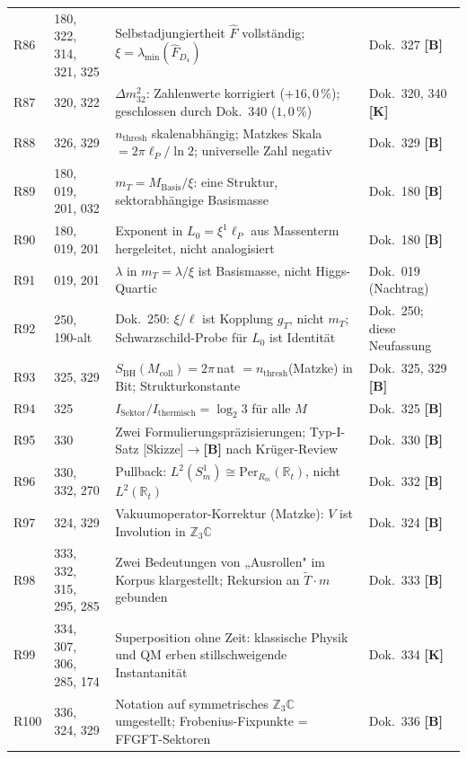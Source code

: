 \begin{longtable}{@{}p{1.2cm}p{3.4cm}p{5.8cm}p{3.4cm}@{}}
R86 & 180, 322, 314, 321, 325 & Selbstadjungiertheit $\hat{F}$ vollständig; $\xi=\lambda_{\min}(\hat{F}_{D_4})$ & Dok.~327 \textbf{[B]} \\
R87 & 320, 322 & $\Delta m_{32}^2$: Zahlenwerte korrigiert ($+16{,}0\,\%$); geschlossen durch Dok.~340 ($1{,}0\,\%$) & Dok.~320, 340 \textbf{[K]} \\
R88 & 326, 329 & $n_{\mathrm{thresh}}$ skalenabhängig; Matzkes Skala $=2\pi\ell_P/\ln 2$; universelle Zahl negativ & Dok.~329 \textbf{[B]} \\
R89 & 180, 019, 201, 032 & $m_T = M_\mathrm{Basis}/\xi$: eine Struktur, sektorabhängige Basismasse & Dok.~180 \textbf{[B]} \\
R90 & 180, 019, 201 & Exponent in $L_0=\xi^1\ell_P$ aus Massenterm hergeleitet, nicht analogisiert & Dok.~180 \textbf{[B]} \\
R91 & 019, 201 & $\lambda$ in $m_T=\lambda/\xi$ ist Basismasse, nicht Higgs-Quartic & Dok.~019 (Nachtrag) \\
R92 & 250, 190-alt & Dok.~250: $\xi/\ell$ ist Kopplung $g_T$, nicht $m_T$; Schwarzschild-Probe für $L_0$ ist Identität & Dok.~250; diese Neufassung \\
R93 & 325, 329 & $S_\mathrm{BH}(M_\mathrm{coll})=2\pi$\,nat $=n_\mathrm{thresh}$(Matzke) in Bit; Strukturkonstante & Dok.~325, 329 \textbf{[B]} \\
R94 & 325 & $I_\mathrm{Sektor}/I_\mathrm{thermisch}=\log_2 3$ für alle $M$ & Dok.~325 \textbf{[B]} \\
R95 & 330 & Zwei Formulierungspräzisierungen; Typ-I-Satz [Skizze]$\to$\textbf{[B]} nach Krüger-Review & Dok.~330 \textbf{[B]} \\
R96 & 330, 332, 270 & Pullback: $L^2(S^1_m)\cong\mathrm{Per}_{R_m}(\mathbb{R}_t)$, nicht $L^2(\mathbb{R}_t)$ & Dok.~332 \textbf{[B]} \\
R97 & 324, 329 & Vakuumoperator-Korrektur (Matzke): $V$ ist Involution in $\mathbb{Z}_3\mathbb{C}$ & Dok.~324 \textbf{[B]} \\
R98 & 333, 332, 315, 295, 285 & Zwei Bedeutungen von „Ausrollen" im Korpus klargestellt; Rekursion an $\tilde{T}\cdot m$ gebunden & Dok.~333 \textbf{[B]} \\
R99 & 334, 307, 306, 285, 174 & Superposition ohne Zeit: klassische Physik und QM erben stillschweigende Instantanität & Dok.~334 \textbf{[K]} \\
R100 & 336, 324, 329 & Notation auf symmetrisches $\mathbb{Z}_3\mathbb{C}$ umgestellt; Frobenius-Fixpunkte = FFGFT-Sektoren & Dok.~336 \textbf{[B]} \\

\end{longtable}
